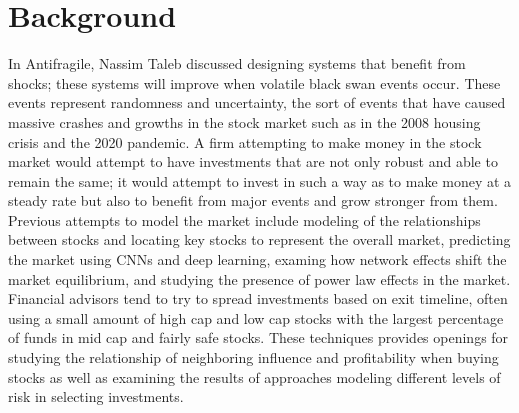 \documentclass[letterpaper, 10 pt, proceedings]{ieeetran}  %
\begin{document}
\section{Background}
In Antifragile, Nassim Taleb discussed designing systems that benefit from shocks; these systems will improve when volatile black swan events occur. These events represent randomness and uncertainty, the sort of events that have caused massive crashes and growths in the stock market such as in the 2008 housing crisis and the 2020 pandemic. A firm attempting to make money in the stock market would attempt to have investments that are not only robust and able to remain the same; it would attempt to invest in such a way as to make money at a steady rate but also to benefit from major events and grow stronger from them. Previous attempts to model the market include modeling of the relationships between stocks and locating key stocks to represent the overall market, predicting the market using CNNs and deep learning, examing how network effects shift the market equilibrium, and studying the presence of power law effects in the market. Financial advisors tend to try to spread investments based on exit timeline, often using a small amount of high cap and low cap stocks with the largest percentage of funds in mid cap and fairly safe stocks. These techniques provides openings for studying the relationship of neighboring influence and profitability when buying stocks as well as examining the results of approaches modeling different levels of risk in selecting investments.
\end{document}
